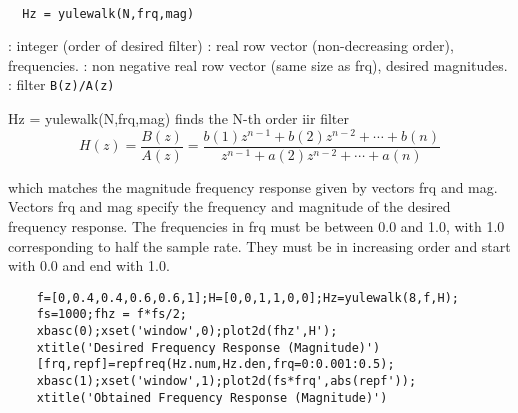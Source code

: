 \begin{mandesc}
   \\ %
\end{mandesc}
\begin{calling_sequence}
\begin{verbatim}
  Hz = yulewalk(N,frq,mag)   
\end{verbatim}
\end{calling_sequence}
\begin{parameters}
  \begin{varlist}
    : integer (order of desired filter)
    : real row vector (non-decreasing order), frequencies.
    : non negative real row vector (same size as frq), desired magnitudes.
    : filter \verb!B(z)/A(z)!
  \end{varlist}
\end{parameters}
\begin{mandescription}
  Hz = yulewalk(N,frq,mag) finds the N-th order iir filter
\[
H(z) = \frac{B(z)}{A(z)} = 
\frac{ b(1)z^{n-1}+b(2)z^{n-2}+\cdots + b(n)}%
{ z^{n-1}+a(2)z^{n-2}+\cdots + a(n)}
\]

which matches the magnitude frequency response given by vectors frq and mag.
Vectors frq and mag specify the frequency and magnitude of the desired
frequency response. The frequencies in frq must be between 0.0 and 1.0,
with 1.0 corresponding to half the sample rate. They must be in
increasing order and start with 0.0 and end with 1.0.
\end{mandescription}
\begin{examples}
  \begin{Verbatim}
    f=[0,0.4,0.4,0.6,0.6,1];H=[0,0,1,1,0,0];Hz=yulewalk(8,f,H);
    fs=1000;fhz = f*fs/2;  
    xbasc(0);xset('window',0);plot2d(fhz',H');
    xtitle('Desired Frequency Response (Magnitude)')
    [frq,repf]=repfreq(Hz.num,Hz.den,frq=0:0.001:0.5);
    xbasc(1);xset('window',1);plot2d(fs*frq',abs(repf'));
    xtitle('Obtained Frequency Response (Magnitude)')
  \end{Verbatim}
\end{examples}
